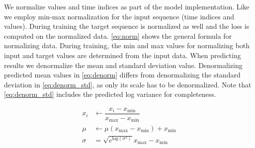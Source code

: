 We normalize values and time indices as part of the model implementation. Like \citet{seifner2025zeroshotimputationfoundationinference} we employ min-max normalization for the input sequence (time indices and values). During training the target sequence is normalized as well and the loss is computed on the normalized data. \autoref{eq:norm} shows the general formula for normalizing data. During training, the min and max values for normalizing both input and target values are determined from the input data. When predicting results we denormalize the mean and standard deviation value. Denormalizing predicted mean values in \autoref{eq:denorm} differs from denormalizing the standard deviation in \autoref{eq:denorm_std}, as only its scale has to be denormalized. Note that \autoref{eq:denorm_std} includes the predicted log variance for completeness.

\begin{align}
x_i &\leftarrow \dfrac{x_i-x_{\text{min}}}{x_{\text{max}}-x_{\text{min}}} \label{eq:norm} \\
\mu &\leftarrow \mu (x_{\text{max}}-x_{\text{min}}) + x_{\text{min}} \label{eq:denorm} \\
\sigma &= \sqrt{e^{\text{log}(\sigma^2)}} x_{\text{max}}-x_{\text{min}} \label{eq:denorm_std} 
\end{align}



